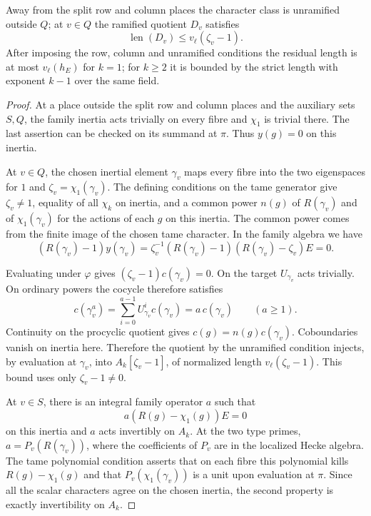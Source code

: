 \begin{lemma}
Away from the split row and column places the character class is
unramified outside \(Q\); at \(v\in Q\) the ramified quotient \(D_v\) satisfies
\[
 \operatorname{len}(D_v)\le v_\ell(\zeta_v-1).
\] After imposing
the row, column and unramified conditions the residual length is at
most \(v_\ell(h_E)\) for \(k=1\); for \(k\ge2\) it is bounded by
the strict length with exponent \(k-1\) over the same field.
\end{lemma}
\begin{proof}
At a place
outside the split row and column places and the auxiliary
sets \(S,Q\), the family inertia acts trivially on every
fibre and \(\chi_1\) is trivial there. The last assertion
can be checked on its summand at \(\pi\). Thus \(y(g)=0\)
on this inertia.

At \(v\in Q\), the chosen inertial element
\(\gamma_v\) maps every fibre into the two eigenspaces for
\(1\) and \(\zeta_v=\chi_1(\gamma_v)\). The defining conditions on the tame generator give \(\zeta_v\ne1\), equality of all
\(\chi_k\) on inertia, and a common power \(n(g)\) of
\(R(\gamma_v)\) and of \(\chi_1(\gamma_v)\) for the actions
of each \(g\) on this inertia. The common power comes from
the finite image of the chosen tame character. In the family
algebra we have
\[
 (R(\gamma_v)-1)y(\gamma_v)
 =\zeta_v^{-1}(R(\gamma_v)-1)(R(\gamma_v)-\zeta_v)E=0.
\]

Evaluating under \(\varphi\) gives
\((\zeta_v-1)c(\gamma_v)=0\). On the target \(U_{\gamma_v}\) acts trivially. On ordinary powers the
cocycle therefore satisfies
\[
 c(\gamma_v^a)=\sum_{i=0}^{a-1}U_{\gamma_v}^ic(\gamma_v)=a\,c(\gamma_v)
 \qquad(a\ge1).
\]
Continuity on the procyclic quotient gives \(c(g)=n(g)c(\gamma_v)\).
Coboundaries vanish on inertia here. Therefore the quotient
by the unramified condition injects, by evaluation at
\(\gamma_v\), into \(A_k[\zeta_v-1]\), of normalized length
\(v_\ell(\zeta_v-1)\). This bound uses only \(\zeta_v-1\ne0\).

At \(v\in S\), there is an integral family operator \(a\)
such that
\[
 a(R(g)-\chi_1(g))E=0
\]
on this inertia and
\(a\) acts invertibly on \(A_k\). At the two type primes,
\(a=P_v(R(\gamma_v))\), where the coefficients of \(P_v\)
are in the localized Hecke algebra. The tame polynomial
condition asserts that on each fibre this polynomial kills
\(R(g)-\chi_1(g)\) and that \(P_v(\chi_1(\gamma_v))\) is
a unit upon evaluation at \(\pi\). Since all the scalar
characters agree on the chosen inertia, the second property
is exactly invertibility on \(A_k\).


\end{proof}
